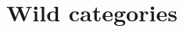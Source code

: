 \documentclass[english,a4paper]{lmcs}
\begin{document}



\appendix
\section{Wild categories}
%





\end{document}
